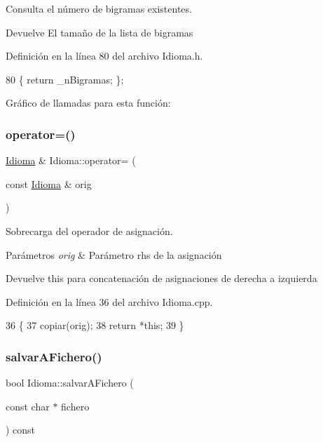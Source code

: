 Consulta el número de bigramas existentes. 

\begin{DoxyReturn}{Devuelve}
El tamaño de la lista de bigramas 
\end{DoxyReturn}


Definición en la línea 80 del archivo Idioma.\+h.


\begin{DoxyCode}
80 \{ \textcolor{keywordflow}{return} \_nBigramas; \};
\end{DoxyCode}
Gráfico de llamadas para esta función\+:
\mbox{\label{classIdioma_a0d073160913271ba93aa8c560a16d1c5}} 
\subsubsection{\texorpdfstring{operator=()}{operator=()}}
{\footnotesize\ttfamily \hyperlink{classIdioma}{Idioma} \& Idioma\+::operator= (\begin{DoxyParamCaption}\item[{const \hyperlink{classIdioma}{Idioma} \&}]{orig }\end{DoxyParamCaption})}



Sobrecarga del operador de asignación. 


\begin{DoxyParams}{Parámetros}
{\em orig} & Parámetro rhs de la asignación \\
\hline
\end{DoxyParams}
\begin{DoxyReturn}{Devuelve}
this para concatenación de asignaciones de derecha a izquierda 
\end{DoxyReturn}


Definición en la línea 36 del archivo Idioma.\+cpp.


\begin{DoxyCode}
36                                             \{
37     copiar(orig);
38     \textcolor{keywordflow}{return} *\textcolor{keyword}{this};
39 \}
\end{DoxyCode}
\mbox{\label{classIdioma_af49108ec99fd517ed7252158859c1b96}} 
\subsubsection{\texorpdfstring{salvar\+A\+Fichero()}{salvarAFichero()}}
{\footnotesize\ttfamily bool Idioma\+::salvar\+A\+Fichero (\begin{DoxyParamCaption}\item[{const char $\ast$}]{fichero }\end{DoxyParamCaption}) const}



